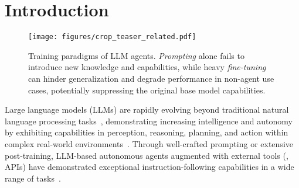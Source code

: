 
\section{Introduction}
\label{sec:intro}

\begin{figure}[t]
  \centering
  \texttt{[image: figures/crop\_teaser\_related.pdf]}
  \caption{Training paradigms of LLM agents.
  \emph{Prompting} alone fails to introduce new knowledge and capabilities, while heavy \emph{fine-tuning} can hinder generalization and degrade performance in non-agent use cases, potentially suppressing the original base model capabilities.
  }
  \vspace{-2ex}
  \label{fig:related}
\end{figure} 

Large language models (LLMs) are rapidly evolving beyond traditional natural language processing tasks~\cite{ouyang2022training, brown2020language, achiam2023gpt}, demonstrating increasing intelligence and autonomy by exhibiting capabilities in perception, reasoning, planning, and action within complex real-world environments~\cite{yao2022react,lu2024chameleon,sun2024adaplanner}.
Through well-crafted prompting or extensive post-training, LLM-based autonomous agents augmented with external tools (\eg, APIs) have demonstrated exceptional instruction-following capabilities in a wide range of  tasks~\citep{schick2024toolformer,qin2023toolllm,srinivasan2023nexusraven,zeng2023agenttuning}. 

